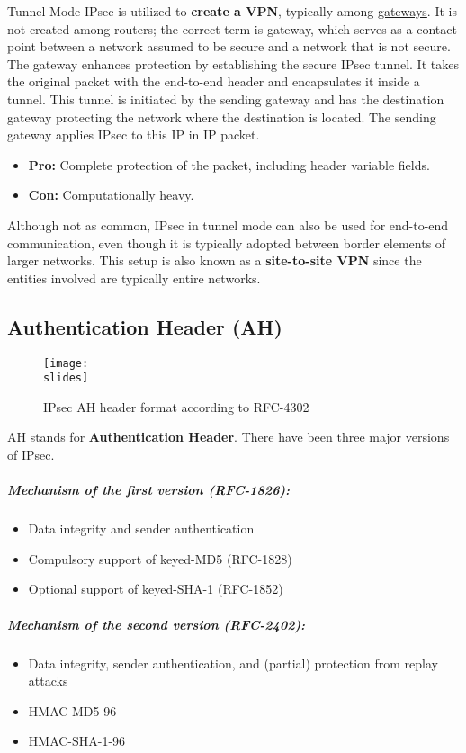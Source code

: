 Tunnel Mode IPsec is utilized to \textbf{create a VPN}, typically among \underline{gateways}. It is not created among routers; the correct term is gateway, which serves as a contact point between a network assumed to be secure and a network that is not secure. The gateway enhances protection by establishing the secure IPsec tunnel. It takes the original packet with the end-to-end header and encapsulates it inside a tunnel. This tunnel is initiated by the sending gateway and has the destination gateway protecting the network where the destination is located. The sending gateway applies IPsec to this IP in IP packet.

\begin{itemize}
    \item \textbf{Pro:} Complete protection of the packet, including header variable fields.
    \item \textbf{Con:} Computationally heavy.
\end{itemize}

Although not as common, IPsec in tunnel mode can also be used for end-to-end communication, even though it is typically adopted between border elements of larger networks. This setup is also known as a \textbf{site-to-site VPN} since the entities involved are typically entire networks.


\subsection{Authentication Header (AH)}
\begin{figure}[h]
    \centering
    \texttt{[image: \\slides]}
    \caption{IPsec AH header format according to RFC-4302}
\end{figure}

AH stands for \textbf{Authentication Header}. There have been three major versions of IPsec.

\subparagraph{Mechanism of the \textbf{first version} (RFC-1826):}
\begin{itemize}
    \item Data integrity and sender authentication
    \item Compulsory support of keyed-MD5 (RFC-1828)
    \item Optional support of keyed-SHA-1 (RFC-1852)
\end{itemize}

\subparagraph{Mechanism of the \textbf{second version} (RFC-2402):}
\begin{itemize}
    \item Data integrity, sender authentication, and (partial) protection from replay attacks
    \item HMAC-MD5-96
    \item HMAC-SHA-1-96
\end{itemize}

